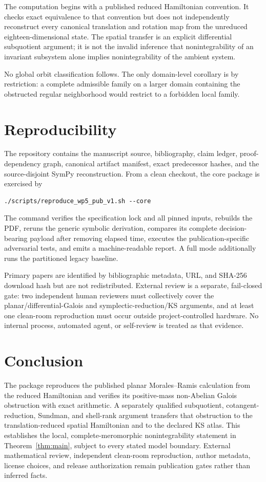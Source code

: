 \documentclass[11pt]{article}
\theoremstyle{definition}
\theoremstyle{remark}
\begin{document}
The computation begins with a published reduced Hamiltonian convention.  It
checks exact equivalence to that convention but does not independently
reconstruct every canonical translation and rotation map from the
unreduced eighteen-dimensional state.  The spatial transfer is an explicit
differential subquotient argument; it is not the invalid inference that
nonintegrability of an invariant subsystem alone implies nonintegrability of
the ambient system.

No global orbit classification follows.  The only domain-level corollary is
by restriction: a complete admissible family on a larger domain containing
the obstructed regular neighborhood would restrict to a forbidden local
family.

\section{Reproducibility}
\label{sec:reproducibility}

The repository contains the manuscript source, bibliography, claim ledger,
proof-dependency graph, canonical artifact manifest, exact predecessor
hashes, and the source-disjoint SymPy reconstruction.  From a clean checkout,
the core package is exercised by
\begin{verbatim}
./scripts/reproduce_wp5_pub_v1.sh --core
\end{verbatim}
The command verifies the specification lock and all pinned inputs, rebuilds
the PDF, reruns the generic symbolic derivation, compares its complete
decision-bearing payload after removing elapsed time, executes the
publication-specific adversarial tests, and emits a machine-readable report.
A full mode additionally runs the partitioned legacy baseline.

Primary papers are identified by bibliographic metadata, URL, and SHA-256
download hash but are not redistributed.  External review is a separate,
fail-closed gate: two independent human reviewers must collectively cover
the planar/differential-Galois and symplectic-reduction/KS arguments, and at
least one clean-room reproduction must occur outside project-controlled
hardware.  No internal process, automated agent, or self-review is treated
as that evidence.

\section{Conclusion}
\label{sec:conclusion}

The package reproduces the published planar Morales--Ramis calculation from
the reduced Hamiltonian and verifies its positive-mass non-Abelian Galois
obstruction with exact arithmetic.  A separately qualified subquotient,
cotangent-reduction, Sundman, and shell-rank argument transfers that
obstruction to the translation-reduced spatial Hamiltonian and to the
declared KS atlas.  This establishes the local, complete-meromorphic
nonintegrability statement in Theorem~\ref{thm:main}, subject to every stated
model boundary.  External mathematical review, independent clean-room
reproduction, author metadata, license choices, and release authorization
remain publication gates rather than inferred facts.



\end{document}
